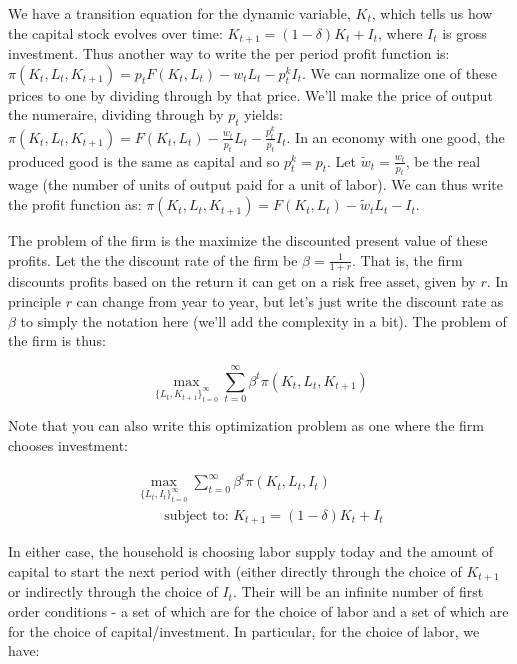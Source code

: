 \documentclass[letterpaper,12pt]{article}
\theoremstyle{definition}
\begin{document}
\begin{spacing}{1.5}
We have a transition equation for the dynamic variable, $K_{t}$, which tells us how the capital stock evolves over time: $K_{t+1} = (1-\delta)K_{t} + I_{t}$, where $I_{t}$ is gross investment. Thus another way to write the per period profit function is: $\pi(K_{t},L_{t},K_{t+1}) = p_{t}F(K_{t},L_{t}) - w_{t}L_{t} - p^{k}_{t}I_{t}$.  We can normalize one of these prices to one by dividing through by that price.  We'll make the price of output the numeraire, dividing through by $p_{t}$ yields: $\pi(K_{t},L_{t},K_{t+1}) = F(K_{t},L_{t}) - \frac{w_{t}}{p_{t}}L_{t} - \frac{p^{k}_{t}}{p_{t}}I_{t}$.  In an economy with one good, the produced good is the same as capital and so $p^{k}_{t}=p_{t}$.   Let $\tilde{w}_{t}=\frac{w_{t}}{p_{t}}$, be the real wage (the number of units of output paid for a unit of labor).  We can thus write the profit function as: $\pi(K_{t},L_{t},K_{t+1}) = F(K_{t},L_{t}) - \tilde{w}_{t}L_{t} - I_{t}$.

The problem of the firm is the maximize the discounted present value of these profits.  Let the the discount rate of the firm be $\beta=\frac{1}{1+r}$.  That is, the firm discounts profits based on the return it can get on a risk free asset, given by $r$.  In principle $r$ can change from year to year, but let's just write the discount rate as $\beta$ to simply the notation here (we'll add the complexity in a bit).  The problem of the firm is thus:

\begin{equation}
\label{eqn:firm_seq_prob}
\max_{\{L_{t},K_{t+1}\}^{\infty}_{t=0}} \sum_{t=0}^{\infty} \beta^{t}\pi(K_{t},L_{t},K_{t+1})
\end{equation}

Note that you can also write this optimization problem as one where the firm chooses investment:

\begin{equation}
\label{eqn:firm_seq_prob2}
\begin{split}
\max_{\{L_{t},I_{t}\}^{\infty}_{t=0}} \sum_{t=0}^{\infty} \beta^{t}\pi(K_{t},L_{t},I_{t}) \\
\quad\quad \text{subject to: } K_{t+1} = (1-\delta)K_{t} + I_{t} 
\end{split}
\end{equation}

In either case, the household is choosing labor supply today and the amount of capital to start the next period with (either directly through the choice of $K_{t+1}$ or indirectly through the choice of $I_{t}$.  Their will be an infinite number of first order conditions - a set of which are for the choice of labor and a set of which are for the choice of capital/investment.  In particular, for the choice of labor, we have:


\end{spacing}
\end{document}
